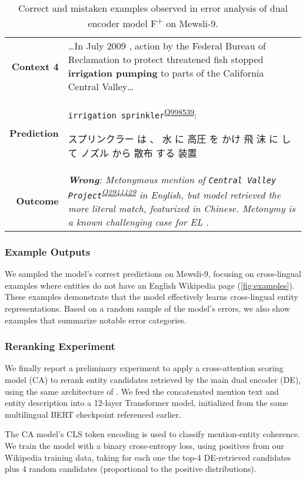 \documentclass[11pt,a4paper]{article}
\newcommand{\entity}[1]{\texttt{#1}}
\newcommand{\ientity}[2]{\entity{#1}\textsuperscript{\href{https://www.wikidata.org/wiki/#2}{#2}}}
\begin{document}
\begin{table*}
\begin{tabular}{r L{.86\textwidth}}
  \textbf{Context 4} & 
      \ldots In July 2009 , action by the Federal Bureau of Reclamation to protect threatened fish stopped \textbf{irrigation pumping} to parts of the California Central Valley\ldots  \\ \cmidrule(lr){2-2}
  \textbf{Prediction} &
      \ientity{irrigation sprinkler}{Q998539}: \begin{CJK}{UTF8}{min}スプリンクラー は 、 水 に 高圧 を かけ 飛 沫 に し て ノズル から 散布 する 装置\end{CJK} \\ \cmidrule(lr){2-2}
  \textbf{Outcome} & \emph{\textbf{Wrong}: Metonymous mention of \ientity{Central Valley Project}{Q2944429} in English, but model retrieved the more literal match, featurized in Chinese. Metonymy is a known challenging case for EL \citep{ling2015design}.} \\ \bottomrule
\end{tabular}
\caption{Correct and mistaken examples observed in error analysis of dual encoder model F\textsuperscript{+} on Mewsli-9.\label{fig:examples}}
\end{table*}



\subsubsection{Example Outputs}
We sampled the model's correct predictions on Mewsli-9, focusing on cross-lingual examples where entities do not have an English Wikipedia page (\autoref{fig:examples}). These examples demonstrate that the model effectively learns cross-lingual entity representations.
Based on a random sample of the model's errors, we also show examples that summarize notable error categories.

\subsubsection{Reranking Experiment}
We finally report a preliminary experiment to apply a cross-attention scoring model (CA) to rerank entity candidates retrieved by the main dual encoder (DE), using the same architecture of . We feed the concatenated mention text and entity description into a 12-layer Transformer model, initialized from the same multilingual BERT checkpoint referenced earlier.

The CA model's CLS token encoding is used to classify mention-entity coherence. We train the model with a binary cross-entropy loss, using positives from our Wikipedia training data, taking for each one the top-4 DE-retrieved candidates plus 4 random candidates 
(proportional to the positive distributions).
\end{document}

